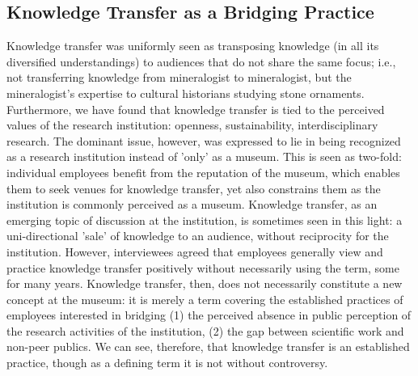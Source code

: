 \documentclass{article}
\begin{document}
\subsection{Knowledge Transfer as a Bridging Practice}
Knowledge transfer was uniformly seen as transposing knowledge (in all its diversified understandings) to audiences that do not share the same focus; i.e., not transferring knowledge from mineralogist to mineralogist, but the mineralogist's expertise to cultural historians studying stone ornaments. Furthermore, we have found that knowledge transfer is tied to the perceived values of the research institution: openness, sustainability, interdisciplinary research. The dominant issue, however, was expressed to lie in being recognized as a research institution instead of 'only' as a museum. This is seen as two-fold: individual employees benefit from the reputation of the museum, which enables them to seek venues for knowledge transfer, yet also constrains them as the institution is commonly perceived as a museum. Knowledge transfer, as an emerging topic of discussion at the institution, is sometimes seen in this light: a uni-directional 'sale' of knowledge to an audience, without reciprocity for the institution. However, interviewees agreed that employees generally view and practice knowledge transfer positively without necessarily using the term, some for many years. Knowledge transfer, then, does not necessarily constitute a new concept at the museum: it is merely a term covering the established practices of employees interested in bridging (1) the perceived absence in public perception of the research activities of the institution, (2) the gap between scientific work and non-peer publics. We can see, therefore, that knowledge transfer is an established practice, though as a defining term it is not without controversy.
\end{document}
